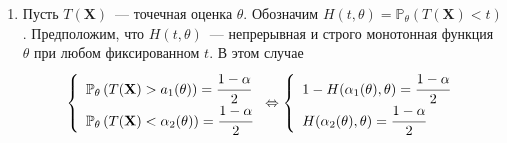 \begin{enumerate}
    \item Пусть $T(\mathbf{X})$~--- точечная оценка $\theta$. Обозначим $H(t, \theta)=\mathbb{P}_{\theta}(T(\mathbf{X})<t)$. Предположим, что $H(t,\theta)$~--- непрерывная и строго монотонная функция $\theta$ при любом фиксированном $t$. В этом случае
    \begin{equation*}
        \left\{\begin{array}{l}
            \mathbb{P}_{\theta}\left(T(\mathbf{X})>a_{1}(\theta)\right)
            = \cfrac{1-\alpha}{2} \\ 
            \mathbb{P}_{\theta}\left(T(\mathbf{X})<\alpha_{2}(\theta)\right)
            = \cfrac{1-\alpha}{2}
        \end{array}\right. 
        \Leftrightarrow 
        \left\{\begin{array}{l}
            1 - H(\alpha_{1}(\theta), \theta)=\cfrac{1-\alpha}{2} \\ 
            H(\alpha_{2}(\theta), \theta)=\cfrac{1-\alpha}{2}
        \end{array}\right.
    \end{equation*}
    

\end{enumerate}
